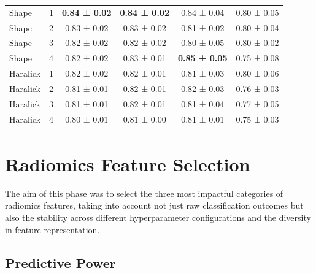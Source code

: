 \begin{table}[htbp]
\begin{tabular}{lccccc}
        \hline \addlinespace
        Shape        & 1 &\textbf{ 0.84 ± 0.02} & \textbf{0.84 ± 0.02} & 0.84 ± 0.04 & 0.80 ± 0.05 \\
        Shape        & 2 & 0.83 ± 0.02 & 0.83 ± 0.02 & 0.81 ± 0.02 & 0.80 ± 0.04 \\
        Shape        & 3 & 0.82 ± 0.02 & 0.82 ± 0.02 & 0.80 ± 0.05 & 0.80 ± 0.02 \\
        Shape        & 4 & 0.82 ± 0.02 & 0.83 ± 0.01 & \textbf{0.85 ± 0.05} & 0.75 ± 0.08 \\
        \hline \addlinespace
        Haralick        & 1 & 0.82 ± 0.02 & 0.82 ± 0.01 & 0.81 ± 0.03 & 0.80 ± 0.06 \\
        Haralick        & 2 & 0.81 ± 0.01 & 0.82 ± 0.01 & 0.82 ± 0.03 & 0.76 ± 0.03 \\
        Haralick        & 3 & 0.81 ± 0.01 & 0.82 ± 0.01 & 0.81 ± 0.04 & 0.77 ± 0.05 \\
        Haralick        & 4 & 0.80 ± 0.01 & 0.81 ± 0.00 & 0.81 ± 0.01 & 0.75 ± 0.03 \\
        \bottomrule
    \end{tabular}
\end{table}

\FloatBarrier



\section{Radiomics Feature Selection}


The aim of this phase was to select the three most impactful categories of radiomics features, taking into account not just raw classification outcomes but also the stability across different hyperparameter configurations and the diversity in feature representation.

\subsection{Predictive Power}

